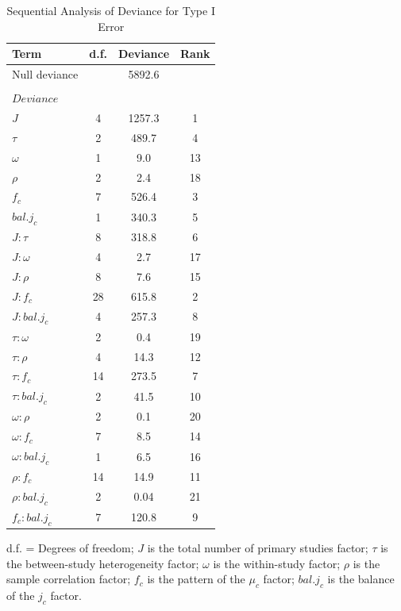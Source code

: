 \begin{table}[H]
\caption{Sequential Analysis of Deviance for Type I Error}
     \label{tab:SequentialAnalysis - Nominal Error}
    \centering
    \begin{tabular*}{\textwidth}{@{\extracolsep{\fill}}
    l
    S[table-format=2.0]
    S[table-format=5.1]
    S[table-format=2.0]
    }
    \toprule
        Term & {d.f.} & {Deviance} & {Rank} \\ 
        \midrule
        Null deviance & & 5892.6  & \\
        &&&\\
       $Deviance$ & & & \\
       $J$ & 4 & 1257.3 & 1 \\
       $\tau$ & 2 & 489.7 & 4  \\ 
       $\omega$ & 1 & 9.0 & 13 \\
       $\rho$ & 2 & 2.4 & 18 \\
       $f_c$ & 7 & 526.4 & 3 \\
       $bal. j_c$ & 1 & 340.3 & 5 \\
       $J:\tau$ & 8 & 318.8 & 6  \\ 
       $J:\omega$ & 4 & 2.7 & 17 \\
       $J:\rho$ & 8 & 7.6  & 15 \\
       $J:f_c$ & 28 & 615.8  & 2  \\
       $J:bal. j_c$ & 4 & 257.3  & 8  \\
       $\tau:\omega$ & 2 &  0.4 & 19  \\
       $\tau:\rho$ & 4 & 14.3 & 12 \\
       $\tau:f_c$ & 14 & 273.5 & 7 \\
       $\tau:bal. j_c$ & 2 & 41.5 & 10 \\
       $\omega:\rho$ & 2 & 0.1 & 20 \\
       $\omega:f_c$ & 7 & 8.5 & 14 \\
       $\omega:bal. j_c$ & 1 & 6.5 & 16 \\
       $\rho:f_c$ & 14 & 14.9 & 11 \\
       $\rho:bal. j_c$ & 2 & 0.04 & 21 \\ 
       $f_c:bal. j_c$ & 7 & 120.8 & 9 \\
        \bottomrule
    \end{tabular*}
   \begin{flushright}
    \footnotesize d.f. = Degrees of freedom; $J$ is the total number of primary studies factor; $\tau$ is the between-study heterogeneity factor; $\omega$ is the within-study factor; $\rho$ is the sample correlation factor; $f_c$ is the pattern of the $\mu_c$ factor; $bal. j_c$ is the balance of the $j_c$ factor. 
    \end{flushright}
\end{table}

